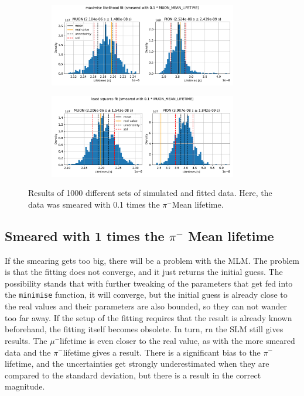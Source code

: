 \documentclass[11pt, a4paper, oneside]{book}
\newcommand\DoublePlotwidth{0.9}
\newcommand{\pion}{$\pi^{-}$}
\newcommand{\muon}{$\mu^{-}$}
\begin{document}
\begin{figure}[h]
\begin{subfigure}{\textwidth}
  \centering
  \includegraphics[width=\DoublePlotwidth\textwidth]{images/4b_hist_1_likelihood.pdf}
\end{subfigure}

\begin{subfigure}{\textwidth}
  \centering
  \includegraphics[width=\DoublePlotwidth\textwidth]{images/4b_hist_1_squares.pdf}
\end{subfigure}
\caption{Results of 1000 different sets of simulated and fitted data. Here, the data was smeared with 0.1 times the \pion Mean lifetime.}
\label{fig:results_smeared_1}
\end{figure}

\FloatBarrier
\newpage
\subsection{Smeared with 1 times the \texorpdfstring{\pion}{pion} Mean lifetime}

If the smearing gets too big, there will be a problem with the MLM. The problem is that the fitting does not converge, and it just returns the initial guess. The possibility stands that with further tweaking of the parameters that get fed into the \lstinline{minimise} function, it will converge, but the initial guess is already close to the real values and their parameters are also bounded, so they can not wander too far away. If the setup of the fitting requires that the result is already known beforehand, the fitting itself becomes obsolete. In turn, rn the SLM still gives results. The \muon lifetime is even closer to the real value, as with the more smeared data and the \pion lifetime gives a result. There is a significant bias to the \pion lifetime, and the uncertainties get strongly underestimated when they are compared to the standard deviation, but there is a result in the correct magnitude.
\end{document}
